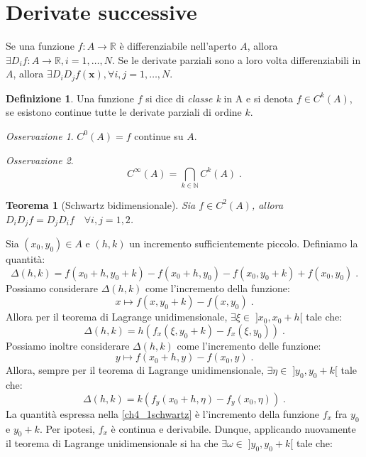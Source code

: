 \documentclass[a4paper,12pt]{report}
\theoremstyle{plain}
\newtheorem{thm}{Teorema}[section]
\theoremstyle{definition}
\newtheorem{defn}{Definizione}[section]
\theoremstyle{remark}
\newtheorem{oss}{Osservazione}[section]
\numberwithin{equation}{section}
\begin{document}
\section{Derivate successive}
Se una funzione $f: A \to \mathbb{R}$ è differenziabile nell'aperto $A$, allora $\exists D_if:A \to \mathbb{R}, i=1,\ldots,N$. Se le 
derivate parziali sono a loro volta differenziabili in $A$, allora $\exists D_iD_jf(\mathbf{x}), \forall i,j=1,\ldots,N$.
\begin{defn} Una funzione $f$ si dice di \textit{classe k} in A e si denota $f \in C^k(A)$, se esistono continue tutte le derivate parziali di ordine $k$.
\end{defn}
\begin{oss} $C^0(A) = f$ continue su $A$.
\end{oss}
\begin{oss}
\begin{equation}
C^{\infty}(A)=\bigcap_{k \in \mathbb{N}} C^k(A)\;.
\end{equation}
\end{oss}
\begin{thm}[Schwartz bidimensionale] Sia $f \in C^2(A)$, allora $D_iD_jf=D_jD_if \quad \forall i,j=1,2$.
\end{thm}
\proof Sia $(x_0,y_0) \in A$ e $(h,k)$ un incremento sufficientemente piccolo. Definiamo la quantità:
\begin{equation}
\Delta(h,k)=f(x_0+h,y_0+k)-f(x_0+h,y_0)-f(x_0,y_0+k)+f(x_0,y_0)\;.
\end{equation}
Possiamo considerare $\Delta(h,k)$ come l'incremento della funzione:
\begin{equation}
x \longmapsto f(x,y_0+k)-f(x,y_0)\;.
\end{equation}
Allora per il teorema di Lagrange unidimensionale, $\exists \xi \in\; ]x_0,x_0+h[$ tale che:
\begin{equation}
\Delta(h,k)=h(f_x(\xi,y_0+k)-f_x(\xi,y_0)) \;. \label{ch4_1schwartz}
\end{equation}
Possiamo inoltre considerare $\Delta(h,k)$ come l'incremento delle funzione:
\begin{equation}
y \longmapsto f(x_0+h,y)-f(x_0,y)\;.
\end{equation}
Allora, sempre per il teorema di Lagrange unidimensionale, $\exists \eta \in\; ]y_0,y_0+k[$ tale che:
\begin{equation}
\Delta(h,k)=k(f_y(x_0+h,\eta)-f_y(x_0,\eta))\;. \label{ch4_2schwartz}
\end{equation}
La quantità espressa nella \eqref{ch4_1schwartz} è l'incremento della funzione $f_x$ fra $y_0$ e $y_0+k$. Per ipotesi, $f_x$ è continua e derivabile. Dunque, applicando nuovamente il teorema di Lagrange unidimensionale si ha che $\exists \omega \in\; ]y_0,y_0+k[$ tale che:
\end{document}
